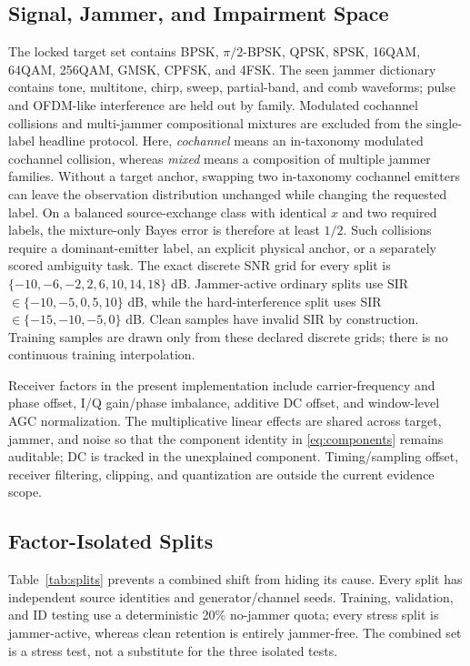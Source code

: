 \documentclass[letterpaper,journal]{IEEEtran}
\begin{document}
\subsection{Signal, Jammer, and Impairment Space}
The locked target set contains BPSK, $\pi/2$-BPSK, QPSK, 8PSK, 16QAM, 64QAM,
256QAM, GMSK, CPFSK, and 4FSK.  The seen jammer dictionary contains tone,
multitone, chirp, sweep, partial-band, and comb waveforms; pulse and OFDM-like
interference are held out by family.  Modulated cochannel collisions and
multi-jammer compositional mixtures are excluded from the single-label
headline protocol.  Here, \emph{cochannel} means an in-taxonomy modulated
cochannel collision, whereas \emph{mixed} means a composition of multiple
jammer families.  Without a target anchor, swapping two in-taxonomy cochannel
emitters can leave
the observation distribution unchanged while changing the requested label.
On a balanced source-exchange class with identical \(x\) and two required
labels, the mixture-only Bayes error is therefore at least \(1/2\).
Such collisions require a dominant-emitter label, an explicit physical anchor,
or a separately scored ambiguity task.  The exact discrete SNR grid for every
split is
\(\{-10,-6,-2,2,6,10,14,18\}\) dB.  Jammer-active ordinary splits use
SIR \(\in\{-10,-5,0,5,10\}\) dB, while the hard-interference split uses
SIR \(\in\{-15,-10,-5,0\}\) dB.  Clean samples have invalid SIR by
construction.  Training samples are drawn only from these declared discrete
grids; there is no continuous training interpolation.

Receiver factors in the present implementation include carrier-frequency and
phase offset, I/Q gain/phase imbalance, additive DC offset, and window-level
AGC normalization.  The multiplicative linear effects are shared across
target, jammer, and noise so that the component identity in
\eqref{eq:components} remains auditable; DC is tracked in the unexplained
component.  Timing/sampling offset, receiver filtering, clipping, and
quantization are outside the current evidence scope.

\subsection{Factor-Isolated Splits}
Table~\ref{tab:splits} prevents a combined shift from hiding its cause.
Every split has independent source identities and generator/channel seeds.
Training, validation, and ID testing use a deterministic 20\% no-jammer
quota; every stress split is jammer-active, whereas clean retention is
entirely jammer-free.
The combined set is a stress test, not a substitute for the three isolated
tests.
\end{document}
